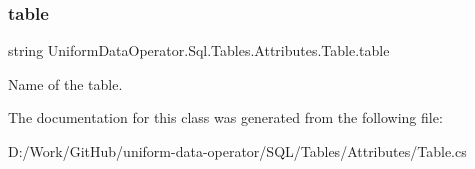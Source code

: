 \subsubsection{\texorpdfstring{table}{table}}
{\footnotesize\ttfamily string Uniform\+Data\+Operator.\+Sql.\+Tables.\+Attributes.\+Table.\+table}



Name of the table. 



The documentation for this class was generated from the following file\+:\begin{DoxyCompactItemize}
\item 
D\+:/\+Work/\+Git\+Hub/uniform-\/data-\/operator/\+S\+Q\+L/\+Tables/\+Attributes/Table.\+cs\end{DoxyCompactItemize}
